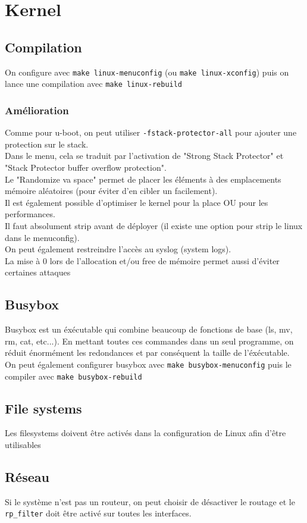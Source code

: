 \documentclass[resume]{subfiles}
\begin{document}
\section{Kernel}
\subsection{Compilation}
On configure avec \verb!make linux-menuconfig! (ou \verb!make linux-xconfig!) puis on lance une compilation avec \verb!make linux-rebuild!
\subsubsection{Amélioration}
Comme pour u-boot, on peut utiliser \verb!-fstack-protector-all! pour ajouter une protection sur le stack.\\
Dans le menu, cela se traduit par l'activation de "Strong Stack Protector" et "Stack Protector buffer overflow protection".\\
Le "Randomize va space" permet de placer les éléments à des emplacements mémoire aléatoires (pour éviter d'en cibler un facilement).\\
Il est également possible d'optimiser le kernel pour la place OU pour les performances.\\
Il faut absolument strip avant de déployer (il existe une option pour strip le linux dans le menuconfig).\\
On peut également restreindre l'accès au syslog (system logs).\\
La mise à 0 lors de l'allocation et/ou free de mémoire permet aussi d'éviter certaines attaques
\subsection{Busybox}
Busybox est un éxécutable qui combine beaucoup de fonctions de base (ls, mv, rm, cat, etc...). En mettant toutes ces commandes dans un seul programme, on réduit énormément les redondances et par conséquent la taille de l'éxécutable.\\
On peut également configurer busybox avec \verb!make busybox-menuconfig! puis le compiler avec \verb!make busybox-rebuild!
\subsection{File systems}
Les filesystems doivent être activés dans la configuration de Linux afin d'être utilisables
\subsection{Réseau}
Si le système n'est pas un routeur, on peut choisir de désactiver le routage et le \verb!rp_filter! doit être activé sur toutes les interfaces.
\end{document}
